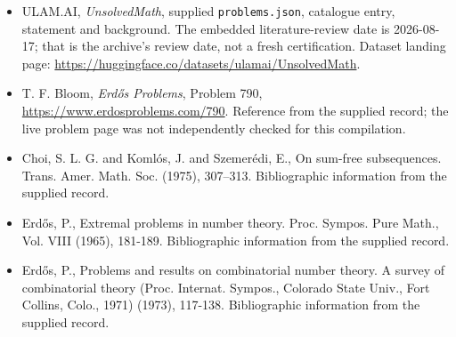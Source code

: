 \documentclass[11pt,a4paper]{article}
\begin{document}
{\small

\begin{itemize}

\item[\hypertarget{source:statement:1}{S1}] ULAM.AI, \emph{UnsolvedMath}, supplied \texttt{problems.json}, catalogue entry, statement and background. The embedded literature-review date is 2026-08-17; that is the archive’s review date, not a fresh certification. Dataset landing page: \url{https://huggingface.co/datasets/ulamai/UnsolvedMath}.

\item[\hypertarget{source:statement:2}{S2}] T. F. Bloom, \emph{Erdős Problems}, Problem 790, \url{https://www.erdosproblems.com/790}. Reference from the supplied record; the live problem page was not independently checked for this compilation.

\item[\hypertarget{source:statement:3}{S3}] Choi, S. L. G. and Koml\'os, J. and Szemer\'{e}di, E., On sum-free subsequences. Trans. Amer. Math. Soc. (1975), 307--313. Bibliographic information from the supplied record.

\item[\hypertarget{source:statement:4}{S4}] Erd\H{o}s, P., Extremal problems in number theory. Proc. Sympos. Pure Math., Vol. VIII (1965), 181-189. Bibliographic information from the supplied record.

\item[\hypertarget{source:statement:5}{S5}] Erd\H{o}s, P., Problems and results on combinatorial number theory. A survey of combinatorial theory (Proc. Internat. Sympos., Colorado State Univ., Fort Collins, Colo., 1971) (1973), 117-138. Bibliographic information from the supplied record.

\end{itemize}

}

\label{end:statement}
\end{document}
